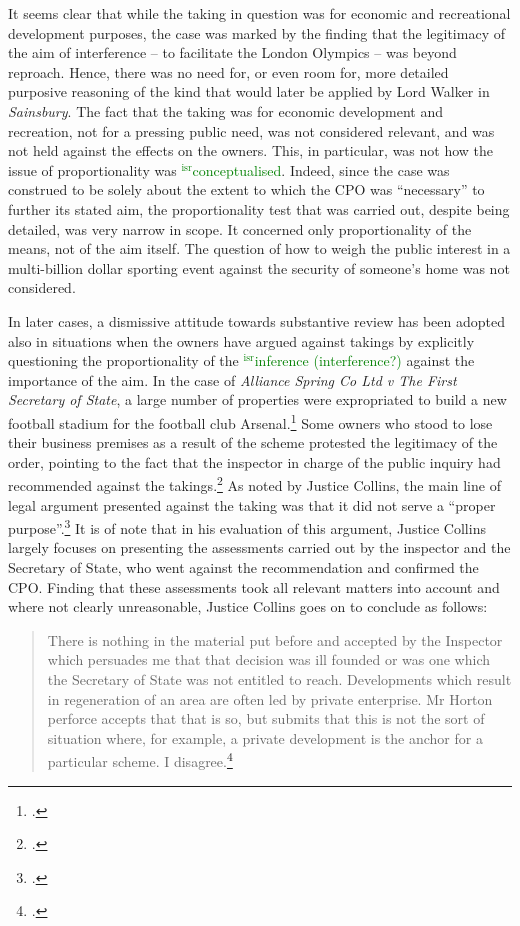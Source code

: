 \documentclass[12pt,a4paper]{book} %
\newcommand{\isr}[1]{\textcolor{green}{$^{\textrm{isr}}${#1}}}
\begin{document}
It seems clear that while the taking in question was for economic and recreational development purposes, the case was marked by the finding that the legitimacy of the aim of interference -- to facilitate the London Olympics -- was beyond reproach. Hence, there was no need for, or even room for, more detailed purposive reasoning of the kind that would later be applied by Lord Walker in {\it Sainsbury}. The fact that the taking was for economic development and recreation, not for a pressing public need, was not considered relevant, and was not held against the effects on the owners. This, in particular, was not how the issue of proportionality was \isr{conceptualised}. Indeed, since the case was construed to be solely about the extent to which the CPO was ``necessary'' to further its stated aim, the proportionality test that was carried out, despite being detailed, was very narrow in scope. It concerned only proportionality of the means, not of the aim itself. The question of how to weigh the public interest in a multi-billion dollar sporting event against the security of someone's home was not considered.

In later cases, a dismissive attitude towards substantive review has been adopted also in situations when the owners have argued against takings by explicitly questioning the proportionality of the \isr{inference (interference?)} against the importance of the aim. In the case of {\it Alliance Spring Co Ltd v The First Secretary of State}, a large number of properties were expropriated to build a new football stadium for the football club Arsenal.\footcite{alliance06} Some owners who stood to lose their business premises as a result of the scheme protested the legitimacy of the order, pointing to the fact that the inspector in charge of the public inquiry had recommended against the takings.\footcite[6-7]{alliance06} As noted by Justice Collins, the main line of legal argument presented against the taking was that it did not serve a ``proper purpose''.\footcite[19]{alliance06} It is of note that in his evaluation of this argument, Justice Collins largely focuses on presenting the assessments carried out by the inspector and the Secretary of State, who went against the recommendation and confirmed the CPO. Finding that these assessments took all relevant matters into account and where not clearly unreasonable, Justice Collins goes on to conclude as follows: 

\begin{quote}
There is nothing in the material put before and accepted by the Inspector which persuades me that that decision was ill founded or was one which the Secretary of State was not entitled to reach. Developments which result in regeneration of an area are often led by private enterprise. Mr Horton perforce accepts that that is so, but submits that this is not the sort of situation where, for example, a private development is the anchor for a particular scheme. I disagree.\footcite[19]{alliance06}
\end{quote}
\end{document}
